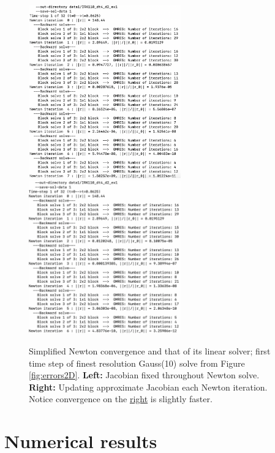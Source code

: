 \documentclass[review]{siamart}
\begin{document}
\begin{figure}[H]
\centerline{
\includegraphics[width = 0.585\textwidth]{figures/simple_newton_basic}
\quad
\includegraphics[width = 0.585\textwidth]{figures/simple_newton_better}
}
\caption{Simplified Newton convergence and that of its linear solver; first time step of finest resolution Gauss(10) solve from Figure \ref{fig:errors2D}.
\textbf{Left:} Jacobian fixed throughout Newton solve. \textbf{Right:} Updating approximate Jacobian each Newton iteration. Notice convergence on the \underline{right} is slightly faster.
\label{fig:simple_newton_convergence}
}
\end{figure}

\newpage
\section{Numerical results}
\end{document}
